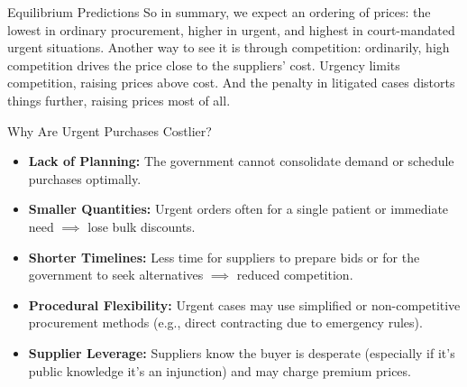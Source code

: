 \documentclass[aspectratio=169]{beamer}
\begin{document}
\begin{frame}{Equilibrium Predictions}
{So in summary, we expect an ordering of prices: the lowest in ordinary procurement, higher in urgent, and highest in court-mandated urgent situations. Another way to see it is through competition: ordinarily, high competition drives the price close to the suppliers' cost. Urgency limits competition, raising prices above cost. And the penalty in litigated cases distorts things further, raising prices most of all.}
\end{frame}

\begin{frame}{Why Are Urgent Purchases Costlier?}
  \begin{itemize}
    \item \textbf{Lack of Planning:} The government cannot consolidate demand or schedule purchases optimally.
    \item \textbf{Smaller Quantities:} Urgent orders often for a single patient or immediate need $\implies$ lose bulk discounts.
    \item \textbf{Shorter Timelines:} Less time for suppliers to prepare bids or for the government to seek alternatives $\implies$ reduced competition.
    \item \textbf{Procedural Flexibility:} Urgent cases may use simplified or non-competitive procurement methods (e.g., direct contracting due to emergency rules).
    \item \textbf{Supplier Leverage:} Suppliers know the buyer is desperate (especially if it's public knowledge it's an injunction) and may charge premium prices.
  \end{itemize}
\end{frame}
\end{document}
